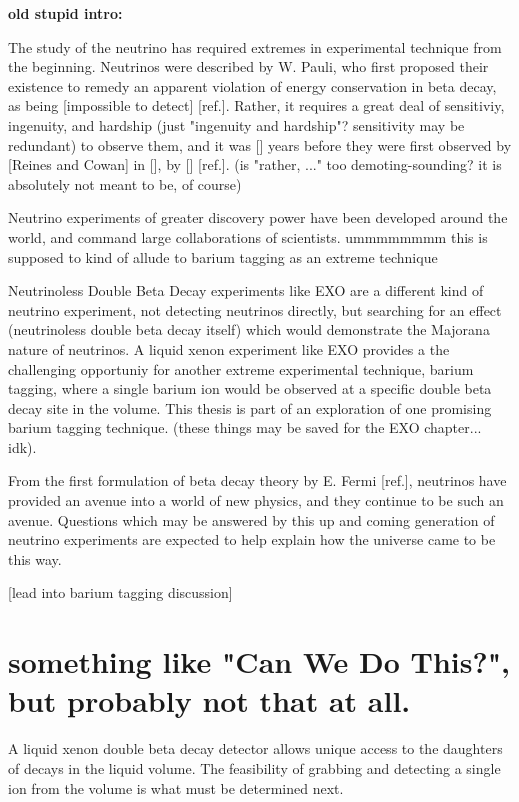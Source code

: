 \noindent
{\color{gray}\textbf{old stupid intro:}

The study of the neutrino has required extremes in experimental technique from the beginning.  Neutrinos were described by W. Pauli, who first proposed their existence to remedy an apparent violation of energy conservation in beta decay, as being [impossible to detect] [ref.].  Rather, it requires a great deal of sensitiviy, ingenuity, and hardship (just "ingenuity and hardship"?  sensitivity may be redundant) to observe them, and it was [] years before they were first observed by [Reines and Cowan] in [], by [] [ref.].  (is "rather, ..." too demoting-sounding?  it is absolutely not meant to be, of course)

Neutrino experiments of greater discovery power have been developed around the world, and command large collaborations of scientists.  ummmmmmmm  this is supposed to kind of allude to barium tagging as an extreme technique

Neutrinoless Double Beta Decay experiments like EXO are a different kind of neutrino experiment, not detecting neutrinos directly, but searching for an effect (neutrinoless double beta decay itself) which would demonstrate the Majorana nature of neutrinos.  A liquid xenon experiment like EXO provides a the challenging opportuniy for another extreme experimental technique, barium tagging, where a single barium ion would be observed at a specific double beta decay site in the volume.  This thesis is part of an exploration of one promising barium tagging technique.  (these things may be saved for the EXO chapter... idk).

From the first formulation of beta decay theory by E. Fermi [ref.], neutrinos have provided an avenue into a world of new physics, and they continue to be such an avenue.  Questions which may be answered by this up and coming generation of neutrino experiments are expected to help explain how the universe came to be this way.

[lead into barium tagging discussion]

\section{something like "Can We Do This?", but probably not that at all.}

A liquid xenon double beta decay detector allows unique access to the daughters of decays in the liquid volume.  The feasibility of grabbing and detecting a single ion from the volume is what must be determined next.}